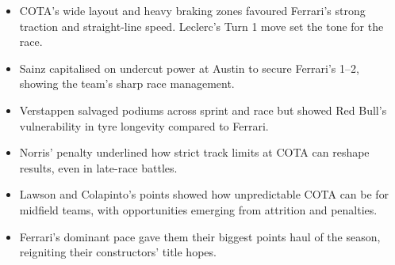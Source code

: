 \begin{itemize}
    \item COTA’s wide layout and heavy braking zones favoured Ferrari’s strong traction and straight-line speed. Leclerc’s Turn 1 move set the tone for the race. 
    \item Sainz capitalised on undercut power at Austin to secure Ferrari’s 1–2, showing the team’s sharp race management. 
    \item Verstappen salvaged podiums across sprint and race but showed Red Bull’s vulnerability in tyre longevity compared to Ferrari. 
    \item Norris’ penalty underlined how strict track limits at COTA can reshape results, even in late-race battles. 
    \item Lawson and Colapinto’s points showed how unpredictable COTA can be for midfield teams, with opportunities emerging from attrition and penalties. 
    \item Ferrari’s dominant pace gave them their biggest points haul of the season, reigniting their constructors’ title hopes.
\end{itemize}
